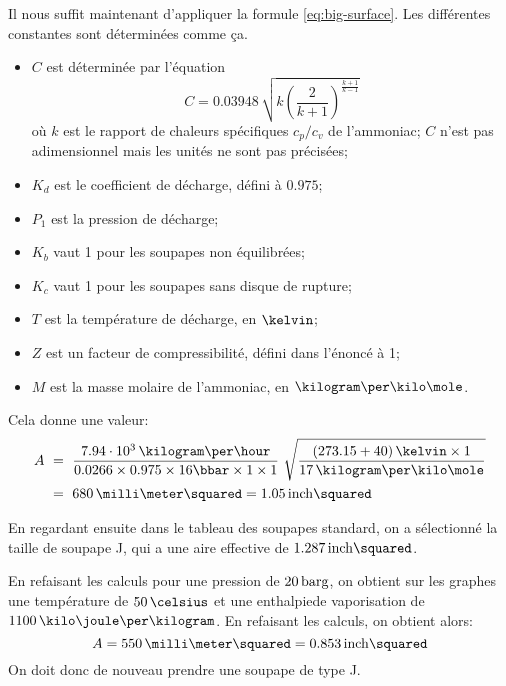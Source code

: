Il nous suffit maintenant d'appliquer la formule \eqref{eq:big-surface}.
Les différentes constantes sont déterminées comme ça.
\begin{itemize}
    \item $C$ est déterminée par l'équation
        \begin{equation}
            C = 0.03948\,\sqrt{k\left(\frac{2}{k+1}\right)^\frac{k+1}{k-1}}
        \end{equation}
        où $k$ est le rapport de chaleurs spécifiques $c_p/c_v$ de l'ammoniac;
        $C$ n'est pas adimensionnel mais les unités ne sont pas précisées;
    \item $K_d$ est le coefficient de décharge, défini à $0.975$;
    \item $P_1$ est la pression de décharge;
    \item $K_b$ vaut 1 pour les soupapes non équilibrées;
    \item $K_c$ vaut 1 pour les soupapes sans disque de rupture;
    \item $T$ est la température de décharge, en $\kelvin$;
    \item $Z$ est un facteur de compressibilité, défini dans l'énoncé à 1;
    \item $M$ est la masse molaire de l'ammoniac, en $\kilogram\per\kilo\mole$.
\end{itemize}
Cela donne une valeur:
\begin{equation*}
    \begin{aligned}
        A\ &=\ \frac{7.94\cdot10^3\,\kilogram\per\hour}
        {0.0266 \times 0.975 \times 16\bbar \times 1 \times 1}\ 
        \sqrt{\frac{(273.15+40)\,\kelvin \times 1}{17\,\kilogram\per\kilo\mole}}
        \\
        &=\ 680\,\milli\meter\squared = 1.05\,\inch\squared
    \end{aligned}
\end{equation*}

En regardant ensuite dans le tableau des soupapes standard,
on a sélectionné la taille de soupape J, qui a une aire
effective de $1.287\,\inch\squared$.

En refaisant les calculs pour une pression de $20\,\mathrm{barg}$, on obtient sur
les graphes une température de $50\,\celsius$
et une enthalpiede vaporisation de $1100\,\kilo\joule\per\kilogram$.
En refaisant les calculs, on obtient alors:
\begin{equation*}
    A = 550\,\milli\meter\squared = 0.853\,\inch\squared
\end{equation*}
On doit donc de nouveau prendre une soupape de type J.

